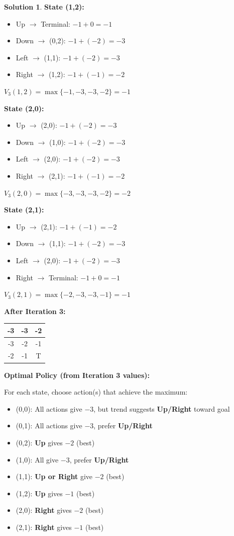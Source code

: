 \documentclass[11pt]{article}
\theoremstyle{definition}
\newtheorem*{solution}{Solution}
\begin{document}
\begin{solution}
\textbf{State (1,2):}
\begin{itemize}
    \item Up $\to$ Terminal: $-1 + 0 = -1$
    \item Down $\to$ (0,2): $-1 + (-2) = -3$
    \item Left $\to$ (1,1): $-1 + (-2) = -3$
    \item Right $\to$ (1,2): $-1 + (-1) = -2$
\end{itemize}
$V_3(1,2) = \max\{-1, -3, -3, -2\} = -1$

\textbf{State (2,0):}
\begin{itemize}
    \item Up $\to$ (2,0): $-1 + (-2) = -3$
    \item Down $\to$ (1,0): $-1 + (-2) = -3$
    \item Left $\to$ (2,0): $-1 + (-2) = -3$
    \item Right $\to$ (2,1): $-1 + (-1) = -2$
\end{itemize}
$V_3(2,0) = \max\{-3, -3, -3, -2\} = -2$

\textbf{State (2,1):}
\begin{itemize}
    \item Up $\to$ (2,1): $-1 + (-1) = -2$
    \item Down $\to$ (1,1): $-1 + (-2) = -3$
    \item Left $\to$ (2,0): $-1 + (-2) = -3$
    \item Right $\to$ Terminal: $-1 + 0 = -1$
\end{itemize}
$V_3(2,1) = \max\{-2, -3, -3, -1\} = -1$

\begin{center}
\textbf{After Iteration 3:}
\begin{tabular}{|c|c|c|}
\hline
-3 & -3 & -2 \\
\hline
-3 & -2 & -1 \\
\hline
-2 & -1 & T \\
\hline
\end{tabular}
\end{center}

\textbf{Optimal Policy (from Iteration 3 values):}

For each state, choose action(s) that achieve the maximum:

\begin{itemize}
    \item (0,0): All actions give $-3$, but trend suggests \textbf{Up/Right} toward goal
    \item (0,1): All actions give $-3$, prefer \textbf{Up/Right}
    \item (0,2): \textbf{Up} gives $-2$ (best)
    \item (1,0): All give $-3$, prefer \textbf{Up/Right}
    \item (1,1): \textbf{Up or Right} give $-2$ (best)
    \item (1,2): \textbf{Up} gives $-1$ (best)
    \item (2,0): \textbf{Right} gives $-2$ (best)
    \item (2,1): \textbf{Right} gives $-1$ (best)
\end{itemize}


\end{solution}
\end{document}
